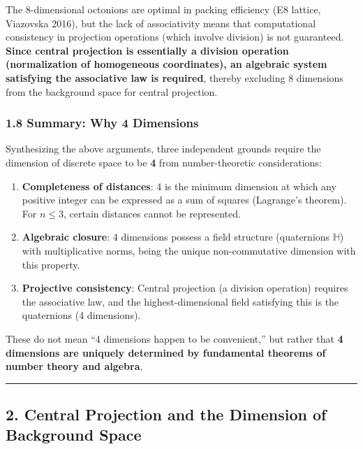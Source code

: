 \documentclass[a4paper,11pt]{article}
\providecommand{\tightlist}{\setlength{\itemsep}{0pt}\setlength{\parskip}{0pt}}
\begin{document}
The 8-dimensional octonions are optimal in packing efficiency (E8
lattice, Viazovska 2016), but the lack of associativity means that
computational consistency in projection operations (which involve
division) is not guaranteed. \textbf{Since central projection is
essentially a division operation (normalization of homogeneous
coordinates), an algebraic system satisfying the associative law is
required}, thereby excluding 8 dimensions from the background space for
central projection.

\subsubsection{1.8 Summary: Why 4
Dimensions}\label{summary-why-4-dimensions}

Synthesizing the above arguments, three independent grounds require the
dimension of discrete space to be \textbf{4} from number-theoretic
considerations:

\begin{enumerate}
\def\labelenumi{\arabic{enumi}.}
\tightlist
\item
  \textbf{Completeness of distances}: 4 is the minimum dimension at
  which any positive integer can be expressed as a sum of squares
  (Lagrange's theorem). For \(n \leq 3\), certain distances cannot be
  represented.
\item
  \textbf{Algebraic closure}: 4 dimensions possess a field structure
  (quaternions \(\mathbb{H}\)) with multiplicative norms, being the
  unique non-commutative dimension with this property.
\item
  \textbf{Projective consistency}: Central projection (a division
  operation) requires the associative law, and the highest-dimensional
  field satisfying this is the quaternions (4 dimensions).
\end{enumerate}

These do not mean ``4 dimensions happen to be convenient,'' but rather
that \textbf{4 dimensions are uniquely determined by fundamental
theorems of number theory and algebra}.

\begin{center}\rule{0.5\linewidth}{0.5pt}\end{center}

\subsection{2. Central Projection and the Dimension of Background
Space}\label{central-projection-and-the-dimension-of-background-space}
\end{document}
